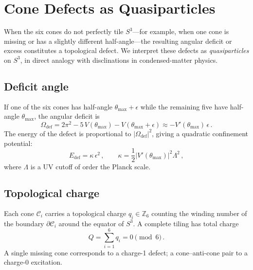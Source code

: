 \documentclass[amsmath,amssymb,aps,prd,twocolumn,superscriptaddress,nofootinbib]{revtex4-2}
\begin{document}
\section{Cone Defects as Quasiparticles}\label{sec:defects}

When the six cones do not perfectly tile $S^3$---for example, when one cone is
missing or has a slightly different half-angle---the resulting angular deficit
or excess constitutes a topological defect.  We interpret these defects as
\emph{quasiparticles} on $S^3$, in direct analogy with disclinations in
condensed-matter physics.

\subsection{Deficit angle}

If one of the six cones has half-angle $\theta_{\max} + \epsilon$ while the
remaining five have half-angle $\theta_{\max}$, the angular deficit is
\begin{equation}\label{eq:deficit}
  \Omega_{\text{def}} = 2\pi^2 - 5\,V(\theta_{\max})
                       - V(\theta_{\max} + \epsilon)
  \approx -V'(\theta_{\max})\,\epsilon\,.
\end{equation}
The energy of the defect is proportional to $|\Omega_{\text{def}}|^2$, giving a
quadratic confinement potential:
\begin{equation}\label{eq:Edefect}
  E_{\text{def}} = \kappa\,\epsilon^2\,,
  \qquad \kappa = \frac{1}{2}\bigl|V'(\theta_{\max})\bigr|^2 \Lambda^2\,,
\end{equation}
where $\Lambda$ is a UV cutoff of order the Planck scale.

\subsection{Topological charge}

Each cone $\mathcal{C}_i$ carries a topological charge $q_i \in \mathbb{Z}_6$
counting the winding number of the boundary $\partial\mathcal{C}_i$ around the
equator of $S^3$.  A complete tiling has total charge
\begin{equation}\label{eq:charge}
  Q = \sum_{i=1}^{6} q_i = 0 \pmod{6}\,.
\end{equation}
A single missing cone corresponds to a charge-1 defect; a cone--anti-cone pair
to a charge-0 excitation.
\end{document}
